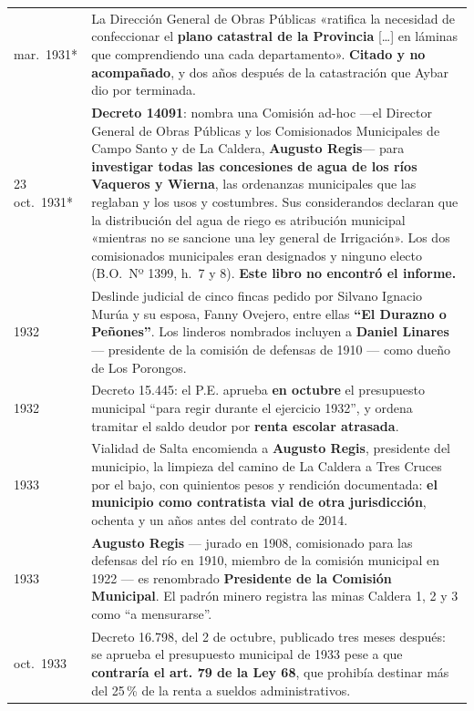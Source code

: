 \begin{longtable}{@{}p{2.7cm}p{10.3cm}@{}}
mar.\ 1931* & La Dirección General de Obras Públicas «ratifica la necesidad de confeccionar el \textbf{plano catastral de la Provincia} [\ldots] en láminas que comprendiendo una cada departamento». \textbf{Citado y no acompañado}, y dos años después de la catastración que Aybar dio por terminada. \\
23 oct.\ 1931* & \textbf{Decreto 14091}: nombra una Comisión ad-hoc ---el Director General de Obras Públicas y los Comisionados Municipales de Campo Santo y de La Caldera, \textbf{Augusto Regis}\index{Regis, Augusto}--- para \textbf{investigar todas las concesiones de agua de los ríos Vaqueros y Wierna}, las ordenanzas municipales que las reglaban y los usos y costumbres. Sus considerandos declaran que la distribución del agua de riego es atribución municipal «mientras no se sancione una ley general de Irrigación». Los dos comisionados municipales eran designados y ninguno electo (B.O.\ Nº 1399, h.\ 7 y 8). \textbf{Este libro no encontró el informe.} \\
1932 & Deslinde judicial de cinco fincas pedido por Silvano Ignacio Murúa y su esposa, Fanny Ovejero, entre ellas \textbf{``El Durazno o Peñones''}. Los linderos nombrados incluyen a \textbf{Daniel Linares\index{Linares, Daniel}} --- presidente de la comisión de defensas de 1910 --- como dueño de Los Porongos. \\
1932 & Decreto 15.445: el P.E. aprueba \textbf{en octubre} el presupuesto municipal ``para regir durante el ejercicio 1932'', y ordena tramitar el saldo deudor por \textbf{renta escolar atrasada}. \\
1933 & Vialidad de Salta encomienda a \textbf{Augusto Regis\index{Regis, Augusto}}, presidente del municipio, la limpieza del camino de La Caldera a Tres Cruces por el bajo, con quinientos pesos y rendición documentada: \textbf{el municipio como contratista vial de otra jurisdicción}, ochenta y un años antes del contrato de 2014. \\
1933 & \textbf{Augusto Regis\index{Regis, Augusto}} --- jurado en 1908, comisionado para las defensas del río en 1910, miembro de la comisión municipal en 1922 --- es renombrado \textbf{Presidente de la Comisión Municipal}. El padrón minero registra las minas Caldera 1, 2 y 3 como ``a mensurarse''. \\
oct.\ 1933 & Decreto 16.798, del 2 de octubre, publicado tres meses después: se aprueba el presupuesto municipal de 1933 pese a que \textbf{contraría el art. 79 de la Ley 68}, que prohibía destinar más del 25\,\% de la renta a sueldos administrativos. \\

\end{longtable}
